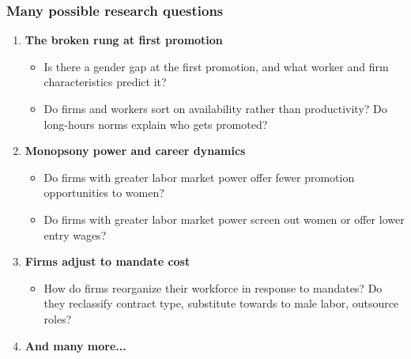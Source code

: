 \documentclass[aspectratio=169, 11pt]{beamer}
\begin{document}
\begin{frame}
\frametitle{Many possible research questions}

\begin{enumerate}
    \item \textbf{The broken rung at first promotion} 
    \begin{itemize}
        \item Is there a gender gap at the first promotion, and what worker and firm characteristics predict it?
        \item Do firms and workers sort on availability rather than productivity? Do long-hours norms explain who gets promoted?
    \end{itemize}
    \medskip
    \item \textbf{Monopsony power and career dynamics}
    \begin{itemize}
        \item Do firms with greater labor market power offer fewer promotion opportunities to women?
        \item Do firms with greater labor market power screen out women or offer lower entry wages?
    \end{itemize}
    \medskip
    \item \textbf{Firms adjust to mandate cost} 
    \begin{itemize}
        \item How do firms reorganize their workforce in response to mandates? Do they reclassify contract type, substitute towards to male labor, outsource roles?
    \end{itemize}
    \item \textbf{And many more...}
\end{enumerate}

\end{frame}
\end{document}
